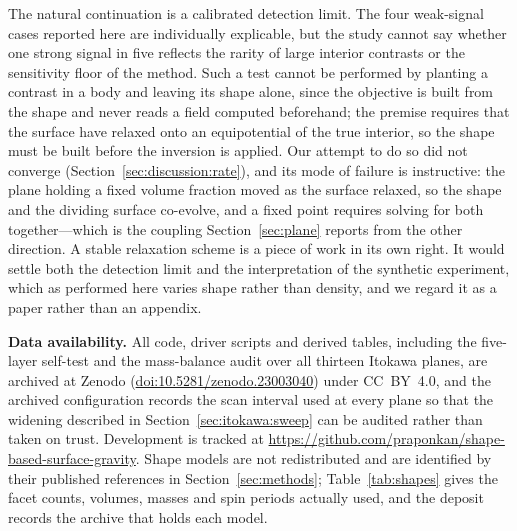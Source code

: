 The natural continuation is a calibrated detection limit. The four
weak-signal cases reported here are individually explicable, but the study
cannot say whether one strong signal in five reflects the rarity of large
interior contrasts or the sensitivity floor of the method. Such a test
cannot be performed by planting a contrast in a body and leaving its shape
alone, since the objective is built from the shape and never reads a field
computed beforehand; the premise requires that the surface have relaxed
onto an equipotential of the true interior, so the shape must be built
before the inversion is applied. Our attempt to do so did not converge
(Section~\ref{sec:discussion:rate}), and its mode of failure is
instructive: the plane holding a fixed volume fraction moved as the
surface relaxed, so the shape and the dividing surface co-evolve, and a
fixed point requires solving for both together---which is the coupling
Section~\ref{sec:plane} reports from the other direction. A stable
relaxation scheme is a piece of work in its own right. It would settle
both the detection limit and the interpretation of the synthetic
experiment, which as performed here varies shape rather than density, and
we regard it as a paper rather than an appendix.

\vspace{1em}
\noindent\textbf{Data availability.} All code, driver scripts and derived
tables, including the five-layer self-test and the mass-balance audit over
all thirteen Itokawa planes, are archived at Zenodo
(\href{https://doi.org/10.5281/zenodo.23003040}{doi:10.5281/zenodo.23003040})
under CC~BY~4.0, and the archived configuration records the scan interval
used at every plane so that the widening described in
Section~\ref{sec:itokawa:sweep} can be audited rather than taken on trust.
Development is tracked at
\url{https://github.com/praponkan/shape-based-surface-gravity}. Shape
models are not redistributed and are identified by their published
references in Section~\ref{sec:methods}; Table~\ref{tab:shapes} gives the
facet counts, volumes, masses and spin periods actually used, and the
deposit records the archive that holds each model.
